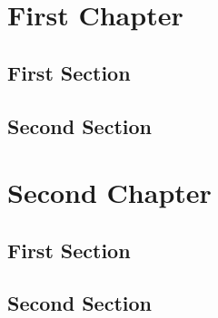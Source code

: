 \chapter{First Chapter}
\section{First Section}
\lipsum[1-10]
\section{Second Section}
\lipsum[10-20]


\chapter{Second Chapter}
\section{First Section}
\lipsum[20-30]
\section{Second Section}
\lipsum[30-50]
